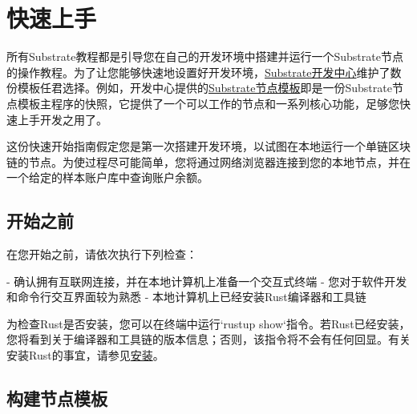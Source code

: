 %
%
%
%
%
%


\chapter{快速上手}

所有Substrate教程都是引导您在自己的开发环境中搭建并运行一个Substrate节点的操作教程。为了让您能够快速地设置好开发环境，\href{https://github.com/substrate-developer-hub/}{Substrate开发中心}维护了数份模板任君选择。例如，开发中心提供的\href{https://github.com/substrate-developer-hub/substrate-node-template/tags/}{Substrate节点模板}即是一份Substrate节点模板主程序的快照，它提供了一个可以工作的节点和一系列核心功能，足够您快速上手开发之用了。

这份快速开始指南假定您是第一次搭建开发环境，以试图在本地运行一个单链区块链的节点。为使过程尽可能简单，您将通过网络浏览器连接到您的本地节点，并在一个给定的样本账户库中查询账户余额。

\section{开始之前}

在您开始之前，请依次执行下列检查：

- 确认拥有互联网连接，并在本地计算机上准备一个交互式终端
- 您对于软件开发和命令行交互界面较为熟悉
- 本地计算机上已经安装Rust编译器和工具链

为检查Rust是否安装，您可以在终端中运行`rustup show`指令。若Rust已经安装，您将看到关于编译器和工具链的版本信息；否则，该指令将不会有任何回显。有关安装Rust的事宜，请参见\href{https://docs.substrate.io/install/}{安装}。

\section{构建节点模板}

